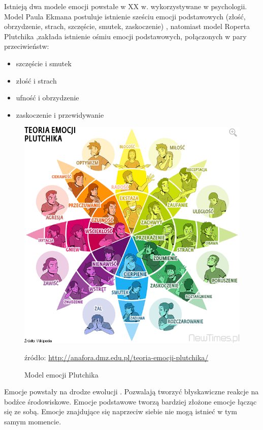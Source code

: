 \documentclass[a4paper,12pt,twoside,openany]{report}
\newcommand{\zrodlo}[1]{\captionsetup{font=scriptsize}\caption*{źródło: \url{#1}}}
\begin{document}
Istnieją dwa modele emocji powstałe w XX w. wykorzystywane w psychologii.
Model Paula Ekmana postuluje istnienie sześciu emocji podstawowych (złość, obrzydzenie, strach, szczęście, smutek, zaskoczenie) \cite{Eisner2015},
natomiast model Roperta Plutchika\cite{Eisner2015} ,zakłada istnienie ośmiu emocji podstawowych, połączonych w pary przeciwieństw:
\begin{itemize}
	\item szczęście i smutek
	\item złość i strach
	\item ufność i obrzydzenie
	\item zaskoczenie i przewidywanie
\end{itemize}
\begin{figure}[h]
	\centering
	\includegraphics[width=\textwidth]{Plutchik-Emotions-Wheel}
	\caption{Model emocji Plutchika}
	\zrodlo{http://anafora.dmz.edu.pl/teoria-emocji-plutchika/}
	\label{rys:intro:plutnik}
\end{figure}
Emocje powstały na drodze ewolucji \cite{Plutchik2001}.
Pozwalają tworzyć błyskawiczne reakcje na bodźce środowiskowe.
Emocje podstawowe tworzą bardziej złożone emocje łącząc się ze sobą.
Emocje znajdujące się naprzeciw siebie nie mogą istnieć w tym samym momencie. 
\end{document}
